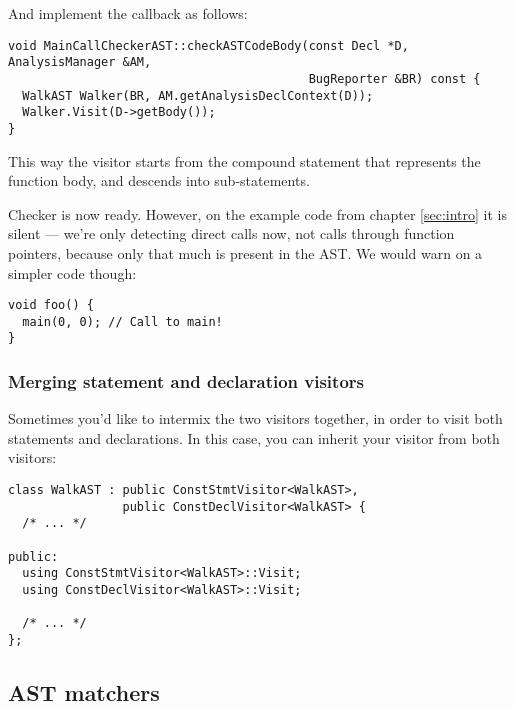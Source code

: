 \documentclass[a4paper,12pt]{article}
\newenvironment{nobr}{\begin{minipage}{\textwidth}\setlength\parskip{1em}
}{\end{minipage}\ignorespacesafterend}
\begin{document}
\begin{nobr}
And implement the callback as follows:
\begin{lstlisting}[style=cplusplus,numbers=none]
void MainCallCheckerAST::checkASTCodeBody(const Decl *D, AnalysisManager &AM,
                                          BugReporter &BR) const {
  WalkAST Walker(BR, AM.getAnalysisDeclContext(D));
  Walker.Visit(D->getBody());
}
\end{lstlisting}
\end{nobr}

This way the visitor starts from the compound statement that represents the function body, and descends into sub-statements.

\begin{nobr}
Checker is now ready. However, on the example code from chapter \ref{sec:intro} it is silent --- we're only detecting direct calls now, not calls through function pointers, because only that much is present in the AST. We would warn on a simpler code though:
\begin{lstlisting}[style=cplusplus,numbers=none]
void foo() {
  main(0, 0); // Call to main!
}
\end{lstlisting}
\end{nobr}


\begin{nobr}
\subsubsection{Merging statement and declaration visitors}

Sometimes you'd like to intermix the two visitors together, in order to visit both statements and declarations. In this case, you can inherit your visitor from both visitors:

\begin{lstlisting}[style=cplusplus,numbers=none]
class WalkAST : public ConstStmtVisitor<WalkAST>,
                public ConstDeclVisitor<WalkAST> {
  /* ... */

public:
  using ConstStmtVisitor<WalkAST>::Visit;
  using ConstDeclVisitor<WalkAST>::Visit;

  /* ... */
};
\end{lstlisting}
\end{nobr}

\subsection{AST matchers}\label{subsec:ast_matchers}
\end{document}
